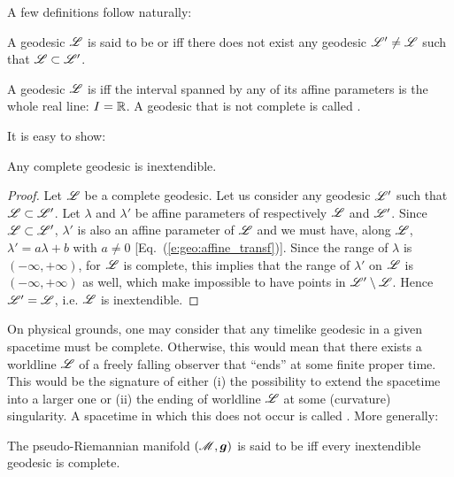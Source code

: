 A few definitions follow naturally:

\begin{greybox}
A geodesic $\mathscr{L}$ is said to be 
or 
iff there does not exist any geodesic $\mathscr{L}'\neq\mathscr{L}$ such that $\mathscr{L}\subset\mathscr{L}'$.
\end{greybox}

\begin{greybox}
A geodesic $\mathscr{L}$ is 
iff the interval spanned by any of its affine parameters is the whole real line:
$I=\mathbb{R}$. A geodesic that is not complete is called .
\end{greybox}

It is easy to show:
\begin{prop}
Any complete geodesic is inextendible.
\end{prop}
\begin{proof}
Let $\mathscr{L}$ be a complete geodesic.
Let us consider any geodesic $\mathscr{L}'$ such that $\mathscr{L}\subset \mathscr{L}'$.
Let $\lambda$ and $\lambda'$ be affine parameters of respectively $\mathscr{L}$
and $\mathscr{L}'$. Since $\mathscr{L}\subset \mathscr{L}'$, $\lambda'$ is also an affine parameter
of $\mathscr{L}$ and we must have, along $\mathscr{L}$,
$\lambda' = a \lambda + b$ with $a\not=0$ [Eq.~(\ref{e:geo:affine_transf})].
Since the range of $\lambda$ is $(-\infty,+\infty)$, for $\mathscr{L}$ is complete,
this implies that the range of $\lambda'$ on $\mathscr{L}$ is $(-\infty,+\infty)$
as well, which make impossible to have points in $\mathscr{L}'\setminus\mathscr{L}$.
Hence $\mathscr{L}'=\mathscr{L}$, i.e. $\mathscr{L}$ is inextendible.
\end{proof}


On physical grounds, one may consider that any timelike geodesic in a given
spacetime must be complete. Otherwise, this would mean that there exists a worldline
$\mathscr{L}$ of a freely falling observer that ``ends'' at some finite proper time. This
would be the signature of either (i) the possibility to extend the spacetime into
a larger one or (ii) the ending of worldline $\mathscr{L}$ at some (curvature)
singularity. A spacetime in which this does not occur
is called .
More generally:
\begin{greybox}
The pseudo-Riemannian manifold $(\mathscr{M},\bm{g})$ is said to be
iff every inextendible geodesic is complete.
\end{greybox}

